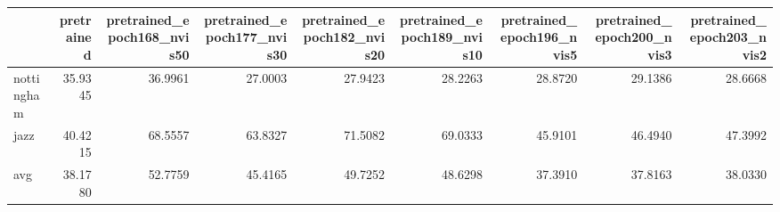 \begin{tabular}{lrrrrrrrr}
\toprule
 & pretrained & pretrained_epoch168_nvis50 & pretrained_epoch177_nvis30 & pretrained_epoch182_nvis20 & pretrained_epoch189_nvis10 & pretrained_epoch196_nvis5 & pretrained_epoch200_nvis3 & pretrained_epoch203_nvis2 \\
\midrule
nottingham & 35.9345 & 36.9961 & 27.0003 & 27.9423 & 28.2263 & 28.8720 & 29.1386 & 28.6668 \\
jazz & 40.4215 & 68.5557 & 63.8327 & 71.5082 & 69.0333 & 45.9101 & 46.4940 & 47.3992 \\
avg & 38.1780 & 52.7759 & 45.4165 & 49.7252 & 48.6298 & 37.3910 & 37.8163 & 38.0330 \\
\bottomrule
\end{tabular}
